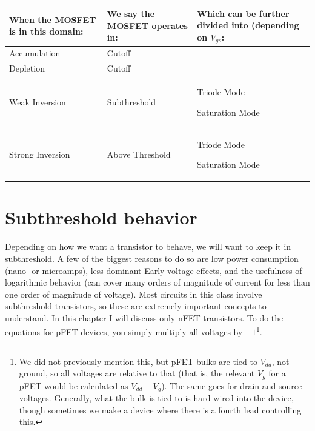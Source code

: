 \begin{longtable}{ |p{4cm}|p{4cm}|p{4cm}| }
\hline
\textbf{When the MOSFET is in this domain:} & \textbf{We say the MOSFET operates in:} & \textbf{Which can be further divided into (depending on $V_{gs}$:} \\ \hline
\endhead
Accumulation & Cutoff & \\ \hline
Depletion & Cutoff & \\ \hline

Weak Inversion & Subthreshold & Triode Mode \par Saturation Mode\\ \hline
 Strong Inversion & Above Threshold & Triode Mode \par Saturation Mode\\ \hline
\end{longtable}





\section{Subthreshold behavior}
Depending on how we want a transistor to behave, we will want to keep it in subthreshold. A few of the biggest reasons to do so are low power consumption (nano- or microamps), less dominant Early voltage effects, and the usefulness of logarithmic behavior (can cover many orders of magnitude of current for less than one order of magnitude of voltage). Most circuits in this class involve subthreshold transistors, so these are extremely important concepts to understand. In this chapter I will discuss only nFET transistors. To do the equations for pFET devices, you simply multiply all voltages by $-1$\footnote{We did not previously mention this, but pFET bulks are tied to $V_{dd}$, not ground, so all voltages are relative to that (that is, the relevant $V_{g}$ for a pFET would be calculated as $V_{dd} - V_{g}$). The same goes for drain and source voltages. Generally, what the bulk is tied to is hard-wired into the device, though sometimes we make a device where there is a fourth lead controlling this.}.
